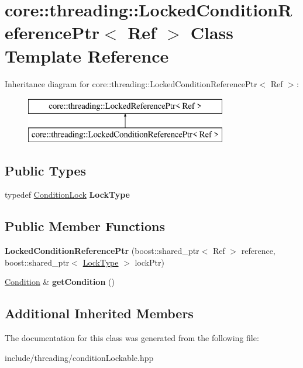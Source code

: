 \hypertarget{classcore_1_1threading_1_1_locked_condition_reference_ptr}{\section{core\-:\-:threading\-:\-:Locked\-Condition\-Reference\-Ptr$<$ Ref $>$ Class Template Reference}
\label{classcore_1_1threading_1_1_locked_condition_reference_ptr}
}
Inheritance diagram for core\-:\-:threading\-:\-:Locked\-Condition\-Reference\-Ptr$<$ Ref $>$\-:\begin{figure}[H]
\begin{center}
\leavevmode
\includegraphics[height=2.000000cm]{classcore_1_1threading_1_1_locked_condition_reference_ptr}
\end{center}
\end{figure}
\subsection*{Public Types}
\begin{DoxyCompactItemize}
\item 
\hypertarget{classcore_1_1threading_1_1_locked_condition_reference_ptr_a0772e4ff006441727ad9b01a952576a4}{typedef \hyperlink{classcore_1_1threading_1_1_condition_lock}{Condition\-Lock} {\bfseries Lock\-Type}}\label{classcore_1_1threading_1_1_locked_condition_reference_ptr_a0772e4ff006441727ad9b01a952576a4}

\end{DoxyCompactItemize}
\subsection*{Public Member Functions}
\begin{DoxyCompactItemize}
\item 
\hypertarget{classcore_1_1threading_1_1_locked_condition_reference_ptr_a9658e4eb73e14d57ad95650cb1813413}{{\bfseries Locked\-Condition\-Reference\-Ptr} (boost\-::shared\-\_\-ptr$<$ Ref $>$ reference, boost\-::shared\-\_\-ptr$<$ \hyperlink{classcore_1_1threading_1_1_condition_lock}{Lock\-Type} $>$ lock\-Ptr)}\label{classcore_1_1threading_1_1_locked_condition_reference_ptr_a9658e4eb73e14d57ad95650cb1813413}

\item 
\hypertarget{classcore_1_1threading_1_1_locked_condition_reference_ptr_ae8d88093614db33c5ad52844c73a2f3a}{\hyperlink{classcore_1_1threading_1_1_condition}{Condition} \& {\bfseries get\-Condition} ()}\label{classcore_1_1threading_1_1_locked_condition_reference_ptr_ae8d88093614db33c5ad52844c73a2f3a}

\end{DoxyCompactItemize}
\subsection*{Additional Inherited Members}


The documentation for this class was generated from the following file\-:\begin{DoxyCompactItemize}
\item 
include/threading/condition\-Lockable.\-hpp\end{DoxyCompactItemize}
